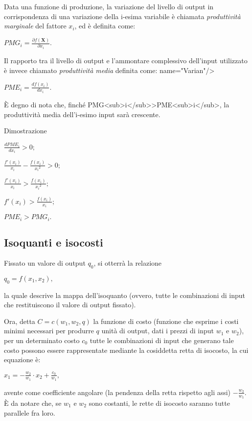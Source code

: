 Data una funzione di produzione, la variazione del livello di output in 
corrispondenza di una variazione della i-esima variabile è chiamata 
\emph{produttività marginale} del fattore \(x_i\), ed è definita 
come:

\(PMG_i=\frac{\partial{f(\mathbf X)}}{\partial{x_i}}.\)

Il rapporto tra il livello di output e l'ammontare complessivo dell'input 
utilizzato è invece chiamato \emph{produttività media} definita come:
name="Varian"/>

\(PME_i=\frac{d{f(x_i)}}{d{x_i}}.\)

È degno di nota che, finché PMG<sub>i</sub>>PME<sub>i</sub>, la produttività 
media dell'i-esimo input sarà crescente. %

Dimostrazione

\(\frac{dPME_i}{dx_i}>0;\)

\(\frac{f'(x_i)}{x_i}-\frac{f(x_i)}{{x_i}^2}>0;\)

\(\frac{f'(x_i)}{x_i}>\frac{f(x_i)}{{x_i}^2};\)

\({f'(x_i)}>\frac{f(x_i)}{x_i};\)

\(PME_i>PMG_i.\)

\subsection{Isoquanti e isocosti}


Fissato un valore di output \(q_0\), si otterrà la relazione

\(q_0=f(x_1, x_2),\)

la quale descrive la mappa dell'isoquanto (ovvero, tutte le combinazioni di 
input che restituiscono il valore di output fissato).

Ora, detta \(C=c(w_1,w_2,q)\) la funzione di costo (funzione che 
esprime i costi minimi necessari per produrre \(q\) unità di output, 
dati i prezzi di input \(w_1\) e \(w_2\)), per un determinato 
costo \(c_0\) tutte le combinazioni di input che generano tale costo 
possono essere rappresentate mediante la cosiddetta retta di isocosto, 
la cui equazione è:

\(x_1=-\frac{w_2}{w_1}\cdot x_2+\frac{c_0}{w_1},\)

avente come coefficiente angolare (la pendenza della retta rispetto agli 
assi) \(- \frac{w_2}{w_1}\). È da notare che, se \(w_1\) e 
\(w_2\) sono costanti, le rette di isocosto saranno tutte 
parallele fra loro.

